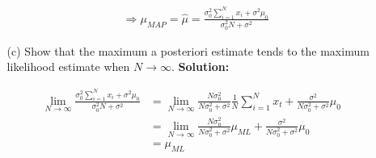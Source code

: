 \documentclass{article}
\begin{document}
\begin{enumerate}
\begin{enumerate}
\begin{align*}
            &\Rightarrow \mu_{MAP}=\hat{\mu}=\frac{\sigma_0^2\sum_{i=1}^N x_i+\sigma^2\mu_0}{\sigma_0^2N+\sigma^2}
        \end{align*}
        \item[(c)] Show that the maximum a posteriori estimate tends to the maximum likelihood estimate when $N\to \infty$.\newline
        {\bf Solution:}\par
        \begin{align*}
            \lim_{N\to\infty} \frac{\sigma_0^2\sum_{i=1}^N x_i+\sigma^2\mu_0}{\sigma_0^2N+\sigma^2} &= \lim_{N\to\infty} \frac{N\sigma_0^2}{N\sigma_0^2+\sigma^2}\frac{1}{N}\sum_{i=1}^Nx_t+\frac{\sigma^2}{N\sigma_0^2+\sigma^2}\mu_0\\
            &= \lim_{N\to\infty} \frac{N\sigma_0^2}{N\sigma_0^2+\sigma^2}\mu_{ML}+\frac{\sigma^2}{N\sigma_0^2+\sigma^2}\mu_0\\
            &= \mu_{ML}
        \end{align*}
        

\end{enumerate}
\end{enumerate}
\end{document}
